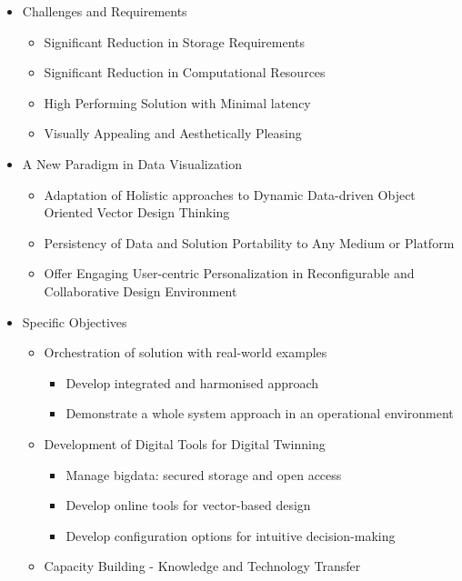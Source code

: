 \documentclass{ammTalk}
\begin{document}
\begin{itemize}[itemsep=5mm]\LARGE
 \item Challenges and Requirements
       \begin{itemize}[before=\large]
        \item Significant Reduction in Storage Requirements
        \item Significant Reduction in Computational Resources
        \item High Performing Solution with Minimal latency
        \item Visually Appealing and Aesthetically Pleasing
       \end{itemize}

 \item A New Paradigm in Data Visualization
       \begin{itemize}[before=\large]
        \item Adaptation of Holistic approaches to Dynamic Data-driven Object Oriented Vector Design Thinking
        \item Persistency of Data and Solution Portability to Any Medium or Platform
        \item Offer Engaging User-centric Personalization in Reconfigurable and Collaborative Design Environment
       \end{itemize}
 \item Specific Objectives
       \begin{itemize}[before=\Large,itemsep=5mm]
        \item Orchestration of solution with real-world examples
              \begin{itemize}[nosep,before=\normalfont\large]
               \item Develop integrated and harmonised approach
               \item Demonstrate a whole system approach in an operational environment
              \end{itemize}
        \item Development of Digital Tools for Digital Twinning
              \begin{itemize}[nosep,before=\normalfont\large]
               \item Manage bigdata: secured storage and open access
               \item Develop online tools for vector-based design
               \item Develop configuration options for intuitive decision-making
              \end{itemize}
        \item Capacity Building - Knowledge and Technology Transfer
       \end{itemize}
\end{itemize}
\end{document}
